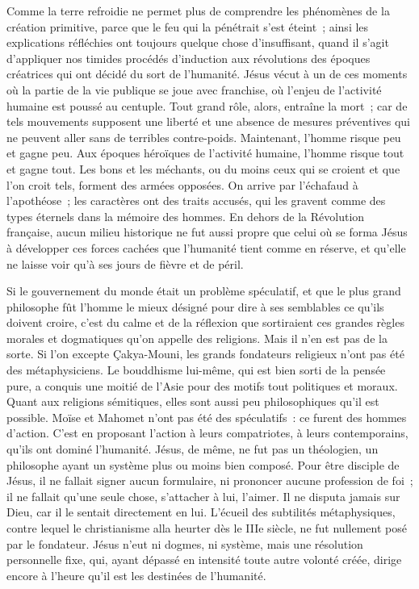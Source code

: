 \documentclass[french,twoside]{book} %
\newcommand\chaptercont{} %
\begin{document}
\chaptercont
\noindent Comme la terre refroidie ne permet plus de comprendre les phénomènes de la création primitive, parce que le feu qui la pénétrait s’est éteint ; ainsi les explications réfléchies ont toujours quelque chose d’insuffisant, quand il s’agit d’appliquer nos timides procédés d’induction aux révolutions des époques créatrices qui ont décidé du sort de l’humanité. Jésus vécut à un de ces moments où la partie de la vie publique se joue avec franchise, où l’enjeu de l’activité humaine est poussé au centuple. Tout grand rôle, alors, entraîne la mort ; car de tels mouvements supposent une liberté et une absence de mesures préventives qui ne peuvent aller sans de terribles contre-poids. Maintenant, l’homme risque peu et gagne peu. Aux époques héroïques de l’activité humaine, l’homme risque tout et gagne tout. Les bons et les méchants, ou du moins ceux qui se croient et que l’on croit tels, forment des armées opposées. On arrive par l’échafaud à l’apothéose ; les caractères ont des traits accusés, qui les gravent comme des types éternels dans la mémoire des hommes. En dehors de la Révolution française, aucun milieu historique ne fut aussi propre que celui où se forma Jésus à développer ces forces cachées que l’humanité tient comme en réserve, et qu’elle ne laisse voir qu’à ses jours de fièvre et de péril.\par
Si le gouvernement du monde était un problème spéculatif, et que le plus grand philosophe fût l’homme le mieux désigné pour dire à ses semblables ce qu’ils doivent croire, c’est du calme et de la réflexion que sortiraient ces grandes règles morales et dogmatiques qu’on appelle des religions. Mais il n’en est pas de la sorte. Si l’on excepte Çakya-Mouni, les grands fondateurs religieux n’ont pas été des métaphysiciens. Le bouddhisme lui-même, qui est bien sorti de la pensée pure, a conquis une moitié de l’Asie pour des motifs tout politiques et moraux. Quant aux religions sémitiques, elles sont aussi peu philosophiques qu’il est possible. Moïse et Mahomet n’ont pas été des spéculatifs : ce furent des hommes d’action. C’est en proposant l’action à leurs compatriotes, à leurs contemporains, qu’ils ont dominé l’humanité. Jésus, de même, ne fut pas un théologien, un philosophe ayant un système plus ou moins bien composé. Pour être disciple de Jésus, il ne fallait signer aucun formulaire, ni prononcer aucune profession de foi ; il ne fallait qu’une seule chose, s’attacher à lui, l’aimer. Il ne disputa jamais sur Dieu, car il le sentait directement en lui. L’écueil des subtilités métaphysiques, contre lequel le christianisme alla heurter dès le IIIe siècle, ne fut nullement posé par le fondateur. Jésus n’eut ni dogmes, ni système, mais une résolution personnelle fixe, qui, ayant dépassé en intensité toute autre volonté créée, dirige encore à l’heure qu’il est les destinées de l’humanité.\par
\end{document}
